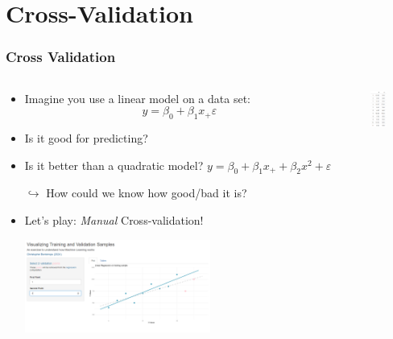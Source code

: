 \documentclass[xcolor=x11names,compress, aspectratio=169]{beamer}
\renewcommand{\(}{\begin{columns}}
\renewcommand{\)}{\end{columns}}
\newcommand{\<}[1]{\begin{column}{#1}}
\renewcommand{\>}{\end{column}}
\begin{document}
\section{Cross-Validation}

\begin{frame} %
\frametitle{Cross Validation}
\begin{columns}[t]
 \begin{column}{0.7\textwidth}
 \begin{itemize}[<+->]
    \item Imagine you use a linear model on a data set:  $$y = \beta_0 + \beta_1 x_ + \varepsilon$$
    \item  Is it good for predicting?
    \item Is it better than a quadratic model? $y = \beta_0 + \beta_1 x_ + + \beta_2 x^2+ \varepsilon$
    \item[$\hookrightarrow$] How could we know how good/bad it is?
    \item Let's play:  \emph{Manual} Cross-validation!
    \item[]  \href{https://xtophedataviz.shinyapps.io/MLRegressionExample/}{\includegraphics[width = 0.6\textwidth]{CrossValidationRegression.png}}
 \end{itemize}
 \end{column}
    \begin{column}{0.5\textwidth}
       \begin{itemize}
        \item[] \includegraphics[width = 0.4\textwidth]{Dataset.png}
       \end{itemize}
    \end{column}
\end{columns}
\end{frame}
\end{document}
